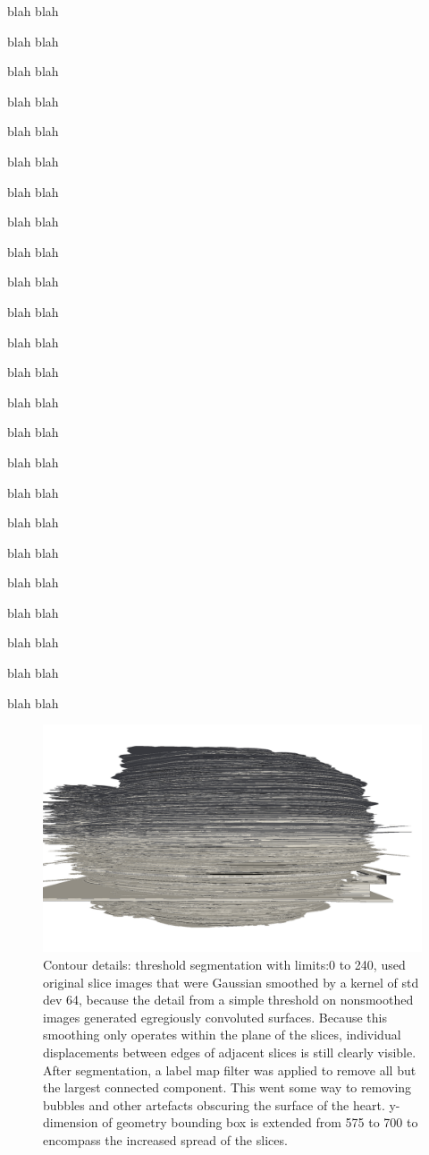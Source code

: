 	blah blah

	blah blah

	blah blah

	blah blah

	blah blah

	blah blah

	blah blah

	blah blah

	blah blah

	blah blah

	blah blah

	blah blah

	blah blah

	blah blah

	blah blah

	blah blah

	blah blah

	blah blah

	blah blah

	blah blah

	blah blah

	blah blah

	blah blah

	blah blah

	\begin{figure}
	  \centering
	  \includegraphics[width=0.9\textheight]{Ch7/Figs/Rat28/contours/whole_positive_x_geometric}
	  \caption{Contour details: threshold segmentation with limits:0 to 240, used original slice images that were Gaussian smoothed by a kernel of std dev 64, because the detail from a simple threshold on nonsmoothed images generated egregiously convoluted surfaces. Because this smoothing only operates within the plane of the slices, individual displacements between edges of adjacent slices is still clearly visible. After segmentation, a label map filter was applied to remove all but the largest connected component. This went some way to removing bubbles and other artefacts obscuring the surface of the heart. y-dimension of geometry bounding box is extended from 575 to 700 to encompass the increased spread of the slices.}
	  \label{fig:image1.png}
	\end{figure}


